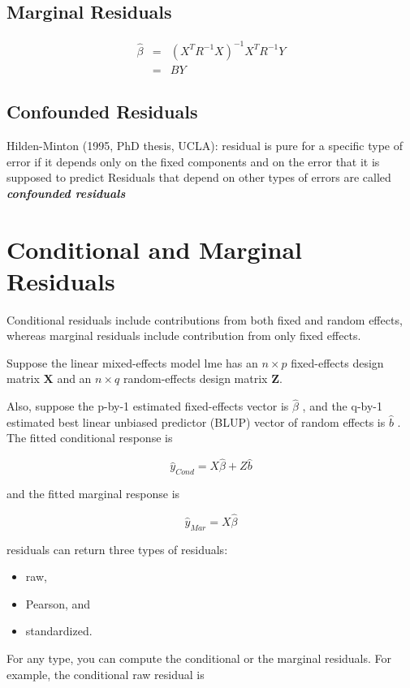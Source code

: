 \documentclass[Main.tex]{subfiles}
\begin{document}
	
	
	
	
	\subsection{Marginal Residuals}
	\begin{eqnarray}
	\hat{\beta} &=& (X^{T}R^{-1}X)^{-1}X^{T}R^{-1}Y \nonumber \\
	&=& BY \nonumber
	\end{eqnarray}
	
	
	
	
	\subsection{Confounded Residuals}
	Hilden-Minton (1995, PhD thesis, UCLA): residual is pure for a
	specific type of error if it depends only on the fixed components and
	on the error that it is supposed to predict
	Residuals that depend on other types of errors are called \textit{\textbf{confounded
			residuals}}
	\section{Conditional and Marginal Residuals}
	Conditional residuals include contributions from both fixed and random effects, whereas marginal residuals include contribution from only fixed effects.
	
	Suppose the linear mixed-effects model lme has an $n \times p$ fixed-effects design matrix $\boldsymbol{X}$ and an $n \times q$ random-effects design matrix $\boldsymbol{Z}$. 
	
	Also, suppose the p-by-1 estimated fixed-effects vector is $\hat{\beta}$ , and the q-by-1 estimated best linear unbiased predictor (BLUP) 
	vector of random effects is $\hat{b}$ . The fitted conditional response is
	
	\[ \hat{y}_{Cond} = X \hat{\beta} + Z \hat{b} \]
	
	and the fitted marginal response is
	
	
	\[ \hat{y}_{Mar} = X \hat{\beta} \]
	
	residuals can return three types of residuals:
	\begin{itemize} 
		\item raw, 
		\item Pearson, and 
		\item standardized.\end{itemize} For any type, you can compute the conditional or the marginal residuals. For example, the conditional raw residual is
	
\end{document}
